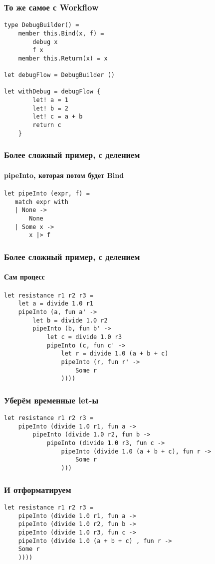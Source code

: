 \documentclass[xetex,mathserif,serif]{beamer}
\begin{document}
	\begin{frame}[fragile]
		\frametitle{То же самое с Workflow}
		\begin{verbatim}
type DebugBuilder() =
    member this.Bind(x, f) = 
        debug x 
        f x
    member this.Return(x) = x

let debugFlow = DebugBuilder ()

let withDebug = debugFlow {
        let! a = 1
        let! b = 2
        let! c = a + b
        return c
    }
		\end{verbatim}
	\end{frame}

	\begin{frame}[fragile]
		\frametitle{Более сложный пример, с делением}
		\framesubtitle{pipeInto, которая потом будет Bind}
		\begin{verbatim}
let pipeInto (expr, f) =
   match expr with
   | None -> 
       None
   | Some x -> 
       x |> f
		\end{verbatim}
	\end{frame}

	\begin{frame}[fragile]
		\frametitle{Более сложный пример, с делением}
		\framesubtitle{Сам процесс}
		\begin{verbatim}
let resistance r1 r2 r3 = 
    let a = divide 1.0 r1
    pipeInto (a, fun a' ->
        let b = divide 1.0 r2
        pipeInto (b, fun b' ->
            let c = divide 1.0 r3
            pipeInto (c, fun c' ->
                let r = divide 1.0 (a + b + c)
                pipeInto (r, fun r' ->
                    Some r
                ))))
		\end{verbatim}
	\end{frame}

	\begin{frame}[fragile]
		\frametitle{Уберём временные let-ы}
		\begin{verbatim}
let resistance r1 r2 r3 = 
    pipeInto (divide 1.0 r1, fun a ->
        pipeInto (divide 1.0 r2, fun b ->
            pipeInto (divide 1.0 r3, fun c ->
                pipeInto (divide 1.0 (a + b + c), fun r ->
                    Some r
                )))
		\end{verbatim}
	\end{frame}

	\begin{frame}[fragile]
		\frametitle{И отформатируем}
		\begin{verbatim}
let resistance r1 r2 r3 = 
    pipeInto (divide 1.0 r1, fun a ->
    pipeInto (divide 1.0 r2, fun b ->
    pipeInto (divide 1.0 r3, fun c ->
    pipeInto (divide 1.0 (a + b + c) , fun r ->
    Some r
    ))))
		\end{verbatim}
	\end{frame}
\end{document}
